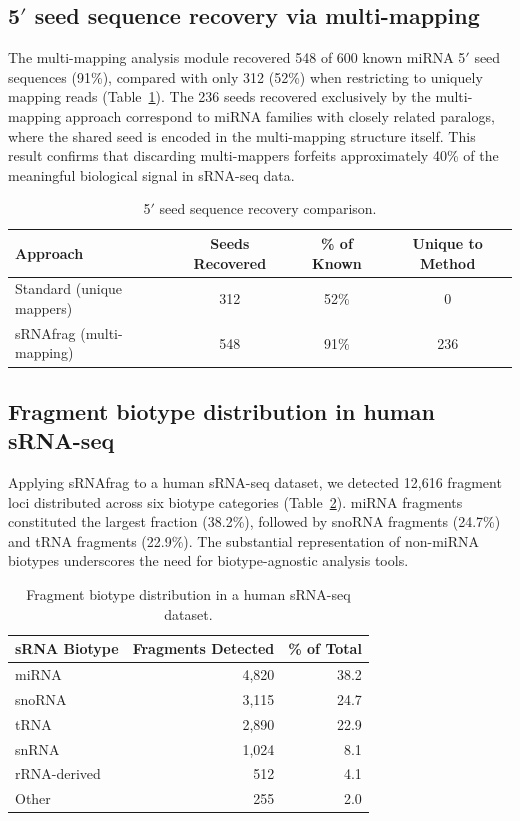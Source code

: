 \documentclass[11pt]{article}
\begin{document}
\subsection{5$'$ seed sequence recovery via multi-mapping}

The multi-mapping analysis module recovered 548 of 600 known miRNA 5$'$ seed sequences (91\%), compared with only 312 (52\%) when restricting to uniquely mapping reads (Table~\ref{tab:seed_recovery}). The 236 seeds recovered exclusively by the multi-mapping approach correspond to miRNA families with closely related paralogs, where the shared seed is encoded in the multi-mapping structure itself. This result confirms that discarding multi-mappers forfeits approximately 40\% of the meaningful biological signal in sRNA-seq data.

\begin{table}[ht]
\centering
\caption{5$'$ seed sequence recovery comparison.}
\label{tab:seed_recovery}
\begin{tabular}{lccc}
\toprule
\textbf{Approach} & \textbf{Seeds Recovered} & \textbf{\% of Known} & \textbf{Unique to Method} \\
\midrule
Standard (unique mappers) & 312 & 52\% & 0 \\
sRNAfrag (multi-mapping) & 548 & 91\% & 236 \\
\bottomrule
\end{tabular}
\end{table}

\subsection{Fragment biotype distribution in human sRNA-seq}

Applying sRNAfrag to a human sRNA-seq dataset, we detected 12,616 fragment loci distributed across six biotype categories (Table~\ref{tab:biotype_dist}). miRNA fragments constituted the largest fraction (38.2\%), followed by snoRNA fragments (24.7\%) and tRNA fragments (22.9\%). The substantial representation of non-miRNA biotypes underscores the need for biotype-agnostic analysis tools.

\begin{table}[ht]
\centering
\caption{Fragment biotype distribution in a human sRNA-seq dataset.}
\label{tab:biotype_dist}
\begin{tabular}{lrr}
\toprule
\textbf{sRNA Biotype} & \textbf{Fragments Detected} & \textbf{\% of Total} \\
\midrule
miRNA & 4,820 & 38.2 \\
snoRNA & 3,115 & 24.7 \\
tRNA & 2,890 & 22.9 \\
snRNA & 1,024 & 8.1 \\
rRNA-derived & 512 & 4.1 \\
Other & 255 & 2.0 \\
\bottomrule
\end{tabular}
\end{table}
\end{document}
